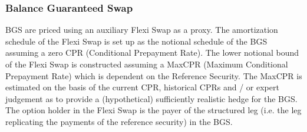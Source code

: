 \subsubsection{Balance Guaranteed Swap}
\label{pricing:cr_bgs}

BGS are priced using an auxiliary Flexi Swap as a proxy. The amortization schedule 
of the Flexi Swap is set up as the notional schedule of the BGS assuming a zero 
CPR (Conditional Prepayment Rate). The lower notional bound of the Flexi Swap is 
constructed assuming a MaxCPR (Maximum Conditional Prepayment Rate) which is 
dependent on the Reference Security. The MaxCPR is estimated on the basis of 
the current CPR, historical CPRs and / or expert judgement as to provide a 
(hypothetical) sufficiently realistic hedge for the BGS. The option holder in 
the Flexi Swap is the payer of the structured leg (i.e. the leg replicating the 
payments of the reference security) in the BGS.
